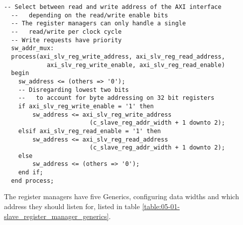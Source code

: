 \begin{lstlisting}[style=hdl, label=Code:05-01-06-regmgr_static, caption=Static code used to manage multiple \texttt{as\_regmgr} modules]
  -- Select between read and write address of the AXI interface
  --   depending on the read/write enable bits
  -- The register managers can only handle a single
  --   read/write per clock cycle
  -- Write requests have priority
  sw_addr_mux:
  process(axi_slv_reg_write_address, axi_slv_reg_read_address, 
            axi_slv_reg_write_enable, axi_slv_reg_read_enable)
  begin
    sw_address <= (others => '0');
    -- Disregarding lowest two bits
    --   to account for byte addressing on 32 bit registers
    if axi_slv_reg_write_enable = '1' then
        sw_address <= axi_slv_reg_write_address
                        (c_slave_reg_addr_width + 1 downto 2);
    elsif axi_slv_reg_read_enable = '1' then
        sw_address <= axi_slv_reg_read_address
                        (c_slave_reg_addr_width + 1 downto 2);
    else
        sw_address <= (others => '0');
    end if;
  end process;
\end{lstlisting}

\bigskip

The register managers have five Generics, configuring data widths and which address they should listen for, listed in table \ref{table:05-01-slave_register_manager_generics}.

